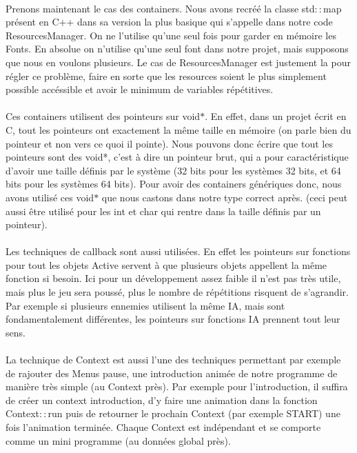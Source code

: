 \paragraph{} Prenons maintenant le cas des containers. Nous avons recréé la classe std$::$map présent en C++ dans sa version la plus basique qui s'appelle dans notre code ResourcesManager. On ne l'utilise qu'une seul fois pour garder en mémoire les Fonts. En absolue on n'utilise qu'une seul font dans notre projet, mais supposons que nous en voulons plusieurs. Le cas de ResourcesManager est justement la pour régler ce problème, faire en sorte que les resources soient le plus simplement possible accéssible et avoir le minimum de variables répétitives.
\paragraph{} Ces containers utilisent des pointeurs sur void$*$. En effet, dans un projet écrit en C, tout les pointeurs ont exactement la même taille en mémoire (on parle bien du pointeur et non vers ce quoi il pointe). Nous pouvons donc écrire que tout les pointeurs sont des void*, c'est à dire un pointeur brut, qui a pour caractéristique d'avoir une taille définis par le système (32 bits pour les systèmes 32 bits, et 64 bits pour les systèmes 64 bits). Pour avoir des containers génériques donc, nous avons utilisé ces void$*$ que nous castons dans notre type correct après. (ceci peut aussi être utilisé pour les int et char qui rentre dans la taille définis par un pointeur).
\paragraph{} Les techniques de callback sont aussi utilisées. En effet les pointeurs sur fonctions pour tout les objets Active servent à que plusieurs objets appellent la même fonction si besoin. Ici pour un développement assez faible il n'est pas très utile, mais plus le jeu sera poussé, plus le nombre de répétitions risquent de s'agrandir. Par exemple si plusieurs ennemies utilisent la même IA, mais sont fondamentalement différentes, les pointeurs sur fonctions IA prennent tout leur sens.
\paragraph{} La technique de Context est aussi l'une des techniques permettant par exemple de rajouter des Menus pause, une introduction animée de notre programme de manière très simple (au Context près). Par exemple pour l'introduction, il suffira de créer un context introduction, d'y faire une animation dans la fonction Context$::$run puis de retourner le prochain Context (par exemple START) une fois l'animation terminée. Chaque Context est indépendant et se comporte comme un mini programme (au données global près).
